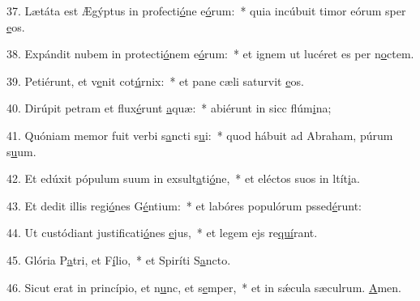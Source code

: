37. Lætáta est Ægýptus in profecti\uline{ó}ne e\uline{ó}rum:~* quia incúbuit timor eórum sper \uline{e}os.\par 
38. Expándit nubem in protecti\uline{ó}nem e\uline{ó}rum:~* et ignem ut lucéret es per n\uline{o}ctem.\par 
39. Petiérunt, et v\uline{e}nit cot\uline{ú}rnix:~* et pane cæli saturvit \uline{e}os.\par 
40. Dirúpit petram et flux\uline{é}runt \uline{a}quæ:~* abiérunt in sicc flúm\uline{i}na;\par 
41. Quóniam memor fuit verbi s\uline{a}ncti s\uline{u}i:~* quod hábuit ad Abraham, púrum s\uline{u}um.\par 
42. Et edúxit pópulum suum in exsult\uline{a}ti\uline{ó}ne,~* et eléctos suos in ltít\uline{i}a.\par 
43. Et dedit illis regi\uline{ó}nes G\uline{é}ntium:~* et labóres populórum pssed\uline{é}runt:\par 
44. Ut custódiant justificati\uline{ó}nes \uline{e}jus,~* et legem ejs re\uline{quí}rant.\par 
45. Glória P\uline{a}tri, et F\uline{í}lio,~* et Spiríti S\uline{a}ncto.\par 
46. Sicut erat in princípio, et n\uline{u}nc, et s\uline{e}mper,~* et in sǽcula sæculrum. \uline{A}men.\par 
